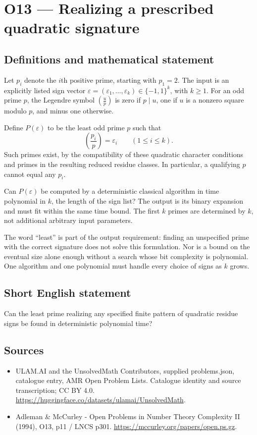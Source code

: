 \documentclass[11pt,a4paper]{article}
\begin{document}
\section*{O13 — Realizing a prescribed quadratic signature}\label{statement}

\subsection{Definitions and mathematical statement}
Let $p_i$ denote the $i$th positive prime, starting with $p_1=2$. The input is an explicitly listed sign vector $\varepsilon=(\varepsilon_1,\ldots,\varepsilon_k)\in\{-1,1\}^k$, with $k\ge1$. For an odd prime $p$, the Legendre symbol $\left(\frac up\right)$ is zero if $p\mid u$, one if $u$ is a nonzero square modulo $p$, and minus one otherwise.

Define $P(\varepsilon)$ to be the least odd prime $p$ such that
\[
\left(\frac{p_i}{p}\right)=\varepsilon_i\qquad(1\le i\le k).
\]
Such primes exist, by the compatibility of these quadratic character conditions and primes in the resulting reduced residue classes. In particular, a qualifying $p$ cannot equal any $p_i$.

Can $P(\varepsilon)$ be computed by a deterministic classical algorithm in time polynomial in $k$, the length of the sign list? The output is its binary expansion and must fit within the same time bound. The first $k$ primes are determined by $k$, not additional arbitrary input parameters.

The word ``least'' is part of the output requirement: finding an unspecified prime with the correct signature does not solve this formulation. Nor is a bound on the eventual size alone enough without a search whose bit complexity is polynomial. One algorithm and one polynomial must handle every choice of signs as $k$ grows.
\subsection{Short English statement}
Can the least prime realizing any specified finite pattern of quadratic residue signs be found in deterministic polynomial time?
\subsection{Sources}
\begin{itemize}
\item[S1] ULAM.AI and the UnsolvedMath Contributors, supplied problems.json, catalogue entry, AMR Open Problem Lists. Catalogue identity and source transcription; CC BY 4.0.
\url{https://huggingface.co/datasets/ulamai/UnsolvedMath}.
\item[S2] Adleman \& McCurley - Open Problems in Number Theory Complexity II (1994), O13, p11 / LNCS p301. 
\url{https://mccurley.org/papers/open.ps.gz}.
\end{itemize}
\end{document}
